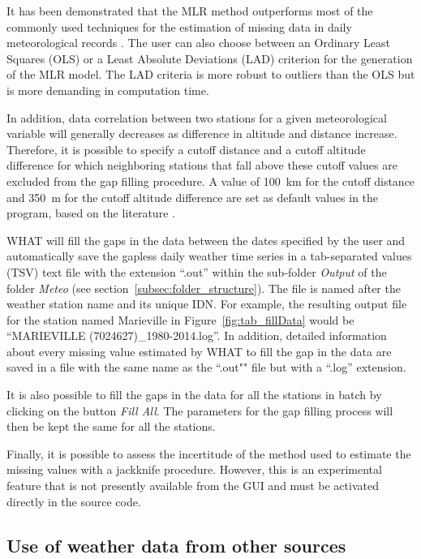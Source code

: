\documentclass[12pt, letterpaper, fleqn]{report}
\begin{document}
It has been demonstrated that the MLR method outperforms most of the commonly used techniques for the estimation of missing data in daily meteorological records \citep{eischeid_quality_1995,eischeid_creating_2000,xia_forest_1999}. The user can also choose between an Ordinary Least Squares (OLS) or a Least Absolute Deviations (LAD) criterion for the generation of the MLR model. The LAD criteria is more robust to outliers than the OLS but is more demanding in computation time. 

In addition, data correlation between two stations for a given meteorological variable will generally decreases as difference in altitude and distance increase. Therefore, it is possible to specify a cutoff distance and a cutoff altitude difference for which neighboring stations that fall above these cutoff values are excluded from the gap filling procedure. A value of 100~km for the cutoff distance and 350~m for the cutoff altitude difference are set as default values in the program, based on the literature 
\citep{tronci_comparison_1986,xia_forest_1999,simolo_improving_2010}. 

WHAT will fill the gaps in the data between the dates specified by the user and automatically save the gapless daily weather time series in a tab-separated values (TSV) text file with the extension ``.out'' within the sub-folder \emph{Output} of the folder \emph{Meteo} (see section~\ref{subsec:folder_structure}). The file is named after the weather station name and its unique IDN. For example, the resulting output file for the station named Marieville in Figure~\ref{fig:tab_fillData} would be ``MARIEVILLE (7024627)\_1980-2014.log''. In addition, detailed information about every missing value estimated by WHAT to fill the gap in the data are saved in a file with the same name as the ``.out"" file but with a ``.log'' extension.

It is also possible to fill the gaps in the data for all the stations in batch by clicking on the button \emph{Fill All}. The parameters for the gap filling process will then be kept the same for all the stations.

Finally, it is possible to assess the incertitude of the method used to estimate the missing values with a jackknife procedure. However, this is an experimental feature that is not presently available from the GUI and must be activated directly in the source code.

\subsection{Use of weather data from other sources}
\end{document}
